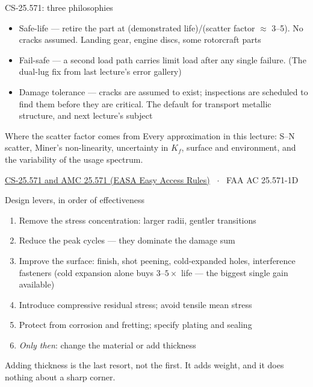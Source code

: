 \documentclass[aspectratio=169,10pt]{beamer}
\begin{document}
\begin{frame}{CS-25.571: three philosophies}
\footnotesize
\begin{itemize}
  \item \alert{Safe-life} --- retire the part at (demonstrated life)/(scatter factor $\approx$ 3--5). No cracks assumed. Landing gear, engine discs, some rotorcraft parts
  \item \alert{Fail-safe} --- a second load path carries limit load after any single failure. (The dual-lug fix from last lecture's error gallery)
  \item \alert{Damage tolerance} --- cracks are assumed to exist; inspections are scheduled to find them before they are critical. The default for transport metallic structure, and next lecture's subject
\end{itemize}
\begin{block}{Where the scatter factor comes from}
Every approximation in this lecture: S--N scatter, Miner's non-linearity, uncertainty in $K_f$, surface and environment, and the variability of the usage spectrum.
\end{block}
\vspace{2pt}
\footnotesize \href{https://www.easa.europa.eu/en/document-library/easy-access-rules/online-publications/easy-access-rules-large-aeroplanes-cs-25}{CS-25.571 and AMC 25.571 (EASA Easy Access Rules)} \ $\cdot$ \ FAA AC 25.571-1D
\end{frame}

\begin{frame}{Design levers, in order of effectiveness}
\begin{enumerate}
  \item \alert{Remove the stress concentration}: larger radii, gentler transitions
  \item \alert{Reduce the peak cycles} --- they dominate the damage sum
  \item \alert{Improve the surface}: finish, shot peening, cold-expanded holes, interference fasteners (cold expansion alone buys $3$--$5\times$ life --- the biggest single gain available)
  \item Introduce compressive residual stress; avoid tensile mean stress
  \item Protect from corrosion and fretting; specify plating and sealing
  \item \emph{Only then}: change the material or add thickness
\end{enumerate}
\begin{alertblock}{}
Adding thickness is the last resort, not the first. It adds weight, and it does nothing about a sharp corner.
\end{alertblock}
\end{frame}
\end{document}
